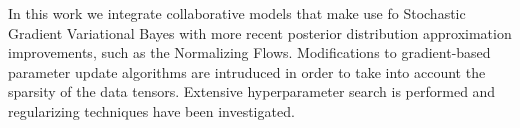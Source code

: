 In this work we integrate collaborative models that make use fo Stochastic Gradient
Variational Bayes with more recent posterior distribution approximation improvements,
such as the Normalizing Flows.
Modifications to gradient-based parameter update algorithms are intruduced
in order to take into account the sparsity of the data tensors.
Extensive hyperparameter search is performed and regularizing techniques have been investigated.
